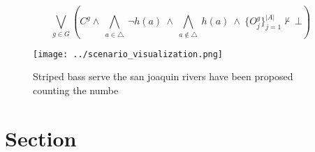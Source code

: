 \documentclass[a4paper]{article}
\begin{document}
\[\bigvee_{g\in G} (C^g \wedge\ \bigwedge_{a\in \triangle}\ \neg h(a)\ \wedge\ \bigwedge_{a\notin \triangle}\ h(a)\ \wedge\ \{O_j^g\}_{j=1}^{|A|} \nvdash\ \bot )\]

\begin{figure}
\centering
\texttt{[image: ../scenario\_visualization.png]}
\caption{Striped bass serve the san joaquin rivers have been proposed counting the numbe
}
\end{figure}
 
\section{Section}
\end{document}
